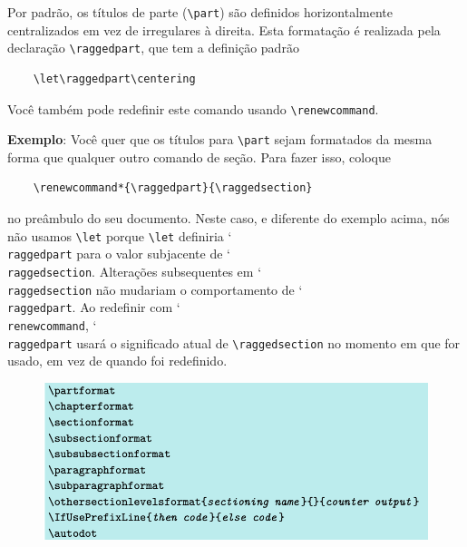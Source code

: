Por padrão, os títulos de parte (\verb|\part|) são definidos horizontalmente centralizados em vez de irregulares à direita. Esta formatação é realizada pela declaração \verb|\raggedpart|, que tem a definição padrão
\begin{verbatim}
    \let\raggedpart\centering
\end{verbatim}


Você também pode redefinir este comando usando \verb|\renewcommand|.

\textbf{Exemplo}: Você quer que os títulos para \verb|\part| sejam formatados da mesma forma que qualquer outro comando de seção. Para fazer isso, coloque
\begin{verbatim}
    \renewcommand*{\raggedpart}{\raggedsection}
\end{verbatim}

no preâmbulo do seu documento. Neste caso, e diferente do exemplo acima, nós não usamos \verb|\let| porque \verb|\let| definiria \char`\\\texttt{rag\-ged\-part} para o valor subjacente de \char`\\\texttt{rag\-ged\-sec\-tion}. Alterações subsequentes em \char`\\\texttt{rag\-ged\-sec\-tion} não mudariam o comportamento de \char`\\\texttt{rag\-ged\-part}. Ao redefinir com \char`\\\texttt{re\-new\-com\-mand}, \char`\\\texttt{rag\-ged\-part} usará o significado atual de \verb|\raggedsection| no momento em que for usado, em vez de quando foi redefinido.

\begin{figure}
    \centering
    \includegraphics[width=0.8\linewidth]{imagens/imagem23.png}
\end{figure}

